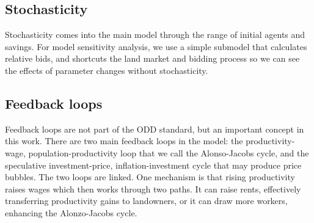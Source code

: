 \subsection{Stochasticity}
Stochasticity comes into the main model through the range of initial agents and savings. For model sensitivity analysis, we use a simple submodel that calculates relative bids, and shortcuts the land market and bidding process so we can see the effects of parameter changes without stochasticity. 

\subsection{Feedback loops}
Feedback loops are not part of the ODD standard, but an important concept in this work. 
There are two main \glspl{feedback loop} in the model: the productivity-wage, population-productivity loop that we call the Alonso-Jacobs cycle, and the speculative investment-price, inflation-investment cycle that may produce price bubbles. 
The two loops are linked. One mechanism is that rising productivity raises wages which then works through two paths. It can raise rents, effectively transferring productivity gains to landowners, or it can draw more workers, enhancing the \Gls{Alonzo-Jacobs cycle}. 

